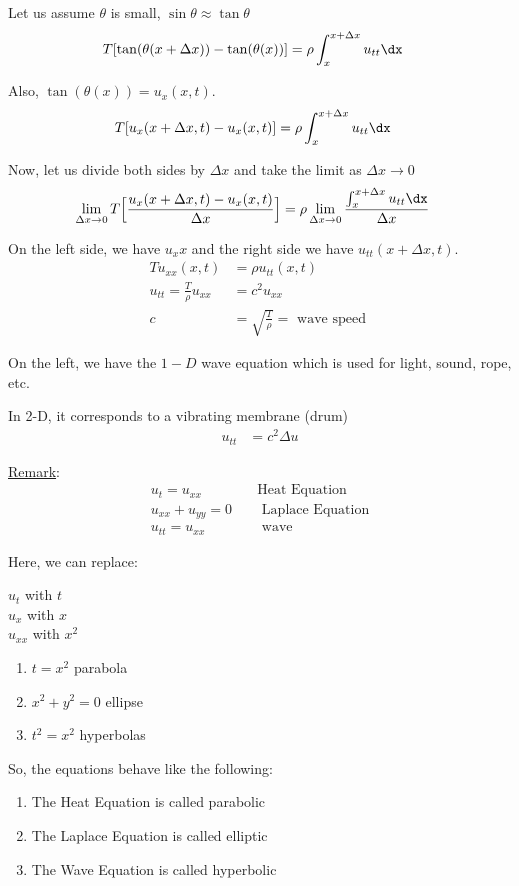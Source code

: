 Let us assume $\theta$ is small, $\sin \theta \approx \tan \theta$
%
\begin{align}
  T[\tan(\theta(x + \Delta x)) - \tan(\theta(x))] & = \rho \int^{x + \Delta x}_x u_{tt} \dx
\end{align}

Also, $\tan(\theta(x)) = u_x(x, t)$.
%
\begin{align}
  T[u_x(x + \Delta x, t) - u_x(x, t)] & =
  \rho \int^{x + \Delta x}_x u_{tt} \dx
\end{align}

Now, let us divide both sides by
$\Delta x$ and take the limit as
$\Delta x \rightarrow 0$
%
\begin{align}
  \lim_{\Delta x \rightarrow 0}
  T\Big[\frac{u_x(x + \Delta x, t) - u_x(x, t)}{\Delta x}\Big]
  & =
  \rho \lim_{\Delta x \rightarrow 0}
  \frac{\int^{x + \Delta x}_x u_{tt} \dx}{\Delta x}
\end{align}

On the left side, we have $u_xx$ and the right side we have
$u_{tt}(x + \Delta x, t)$.
%
\begin{align}
  Tu_{xx}(x, t) & = \rho u_{tt}(x, t)\\
  u_{tt} = \frac{T}{\rho} u_{xx} & = c^2 u_{xx}\\
  c & = \sqrt{\frac{T}{\rho}} = \text{ wave speed }
\end{align}

On the left, we have the $1-D$ wave equation which is used for light, sound, rope, etc.

In 2-D, it corresponds to a vibrating membrane (drum)
%
\begin{align}
  u_{tt} & = c^2\Delta u
\end{align}

\underline{Remark}:
%
\begin{align}
  u_t = u_{xx} \quad & \text{Heat Equation}\\
  u_{xx} + u_{yy} = 0 \quad & \text{ Laplace Equation}\\
  u_{tt} = u_{xx} \quad & \text{ wave}
\end{align}

Here, we can replace:

$u_t$ with $t$\\
$u_x$ with $x$\\
$u_{xx}$ with $x^2$
%
\begin{enumerate}
  \item $t = x^2$ parabola
  \item $x^2 + y^2 = 0$ ellipse
  \item $t^2 = x^2$ hyperbolas
\end{enumerate}

So, the equations behave like the following:
%
\begin{enumerate}
  \item The Heat Equation is called parabolic
  \item The Laplace Equation is called elliptic
  \item The Wave Equation is called hyperbolic
\end{enumerate}

